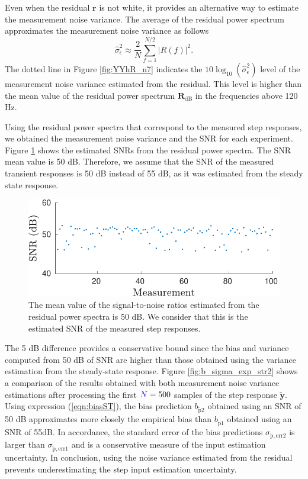 Even when the residual $\mathbf{r}$ is not white, it provides an alternative way to estimate the measurement noise variance. 
The average of the residual power spectrum approximates the measurement noise variance as follows
\begin{equation} \widehat{\sigma}_\epsilon^2 \approx \dfrac{2}{N} \sum_{f = 1}^{N/2} \left| R \left( f \right) \right|^2 . \label{eqn:P_R} \end{equation}
The dotted line in Figure \ref{fig:YYhR_n7} indicates the $10 \log_{10} \left( \widehat{\sigma}_\epsilon^2 \right)$ level of the measurement noise variance estimated from the residual.
This level is higher than the mean value of the residual power spectrum $\mathbf{R}_\mathrm{dB}$ in the frequencies above 120 Hz.

Using the residual power spectra that correspond to the measured step responses, we obtained the measurement noise variance and the SNR for each experiment.
Figure \ref{fig:meas_SNR} shows the estimated SNRs from the residual power spectra. 
The SNR mean value is 50 dB.
Therefore, we assume that the SNR of the measured transient responses is 50 dB instead of 55 dB, as it was estimated from the steady state response.

\begin{figure}[!htb]
\centering
\includegraphics[width=0.69\columnwidth]{./ChapterExperimentalValidation/fig/Fig_10.pdf}
\caption{ \label{fig:meas_SNR} 
The mean value of the signal-to-noise ratios estimated from the residual power spectra is 50 dB.
We consider that this is the estimated SNR of the measured step responses.}
\end{figure}

The 5 dB difference provides a conservative bound since the bias and variance computed from 50 dB of SNR are higher than those obtained using the variance estimation from the steady-state response. 
Figure \ref{fig:b_sigma_exp_str2} shows a comparison of the results obtained with both measurement noise variance estimations after processing the first $\color{blue}N\color{black}=500$ samples of the step response $\widetilde{\mathbf{y}}$.
Using expression (\ref{eqn:biasST}), the bias prediction  $b_{\widetilde{\mathrm{p}}2}$ obtained using an SNR of 50 dB approximates more closely the empirical bias than $b_{\widetilde{\mathrm{p}}1}$ obtained using an SNR of 55dB.
In accordance, the standard error of the bias predictions $\sigma_{\widetilde{\mathrm{p}}\mathrm{,err2}}$ is larger than $\sigma_{\widetilde{\mathrm{p}}\mathrm{,err1}}$ and is a conservative measure of the input estimation uncertainty.
In conclusion, using the noise variance estimated from the residual prevents underestimating the step input estimation uncertainty.



